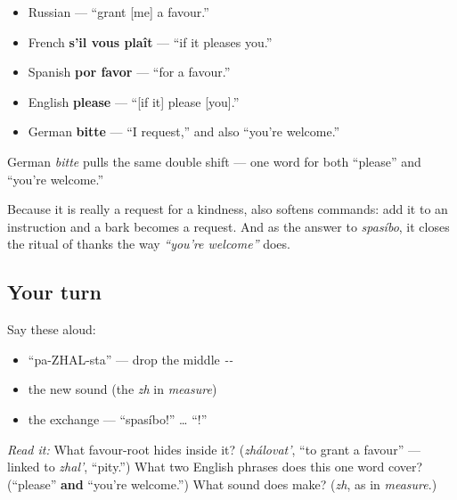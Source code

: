 \begin{cousinweb}
\begin{itemize}
\raggedright
  \item Russian \textbf{} — \textquotedblleft{}grant {[}me{]} a favour.\textquotedblright{}
  \item French \textbf{s'il vous plaît} — \textquotedblleft{}if it pleases you.\textquotedblright{}
  \item Spanish \textbf{por favor} — \textquotedblleft{}for a favour.\textquotedblright{}
  \item English \textbf{please} — \textquotedblleft{}{[}if it{]} please {[}you{]}.\textquotedblright{}
  \item German \textbf{bitte} — \textquotedblleft{}I request,\textquotedblright{} and also \textquotedblleft{}you're welcome.\textquotedblright{}
\end{itemize}

German \emph{bitte} pulls the same double shift — one word for both \textquotedblleft{}please\textquotedblright{} and \textquotedblleft{}you're welcome.\textquotedblright{}
\end{cousinweb}

\begin{culture}
Because it is really a request for a kindness, \emph{} also softens commands: add it to an instruction and a bark becomes a request. And as the answer to \emph{spasíbo}, it closes the ritual of thanks the way \emph{\textquotedblleft{}you're welcome\textquotedblright{}} does.
\end{culture}

\subsection*{Your turn}
Say these aloud:

\begin{itemize}
\raggedright
  \item \textquotedblleft{}pa-ZHAL-sta\textquotedblright{} — drop the middle \emph{--}
  \item the new sound  (the \emph{zh} in \emph{measure})
  \item the exchange — \textquotedblleft{}spasíbo!\textquotedblright{} … \textquotedblleft{}!\textquotedblright{}
\end{itemize}

\begin{tcolorbox}[breakable,colback=teal!4,colframe=teal!35!black,title={Before you move on}]
\emph{Read it:} \textbf{} What favour-root hides inside it? (\emph{zhálovat'}, \textquotedblleft{}to grant a favour\textquotedblright{} — linked to \emph{zhal'}, \textquotedblleft{}pity.\textquotedblright{}) What two English phrases does this one word cover? (\textquotedblleft{}please\textquotedblright{} \textbf{and} \textquotedblleft{}you're welcome.\textquotedblright{}) What sound does  make? (\emph{zh}, as in \emph{measure}.)
\end{tcolorbox}
